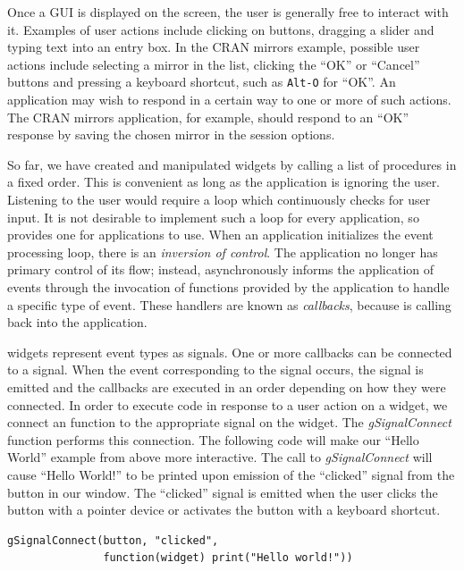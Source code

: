 \documentclass[article]{jss}
\begin{document}
Once a GUI is displayed on the screen, the user is 
generally free to interact with it. Examples of user actions include 
clicking on buttons, dragging a slider and typing text into an entry
box.
In the CRAN mirrors example, possible user actions include
selecting a mirror in the list, clicking the ``OK'' or ``Cancel''
buttons 
and pressing a keyboard shortcut, such as \texttt{Alt-O} for ``OK''. 
An application may wish to respond in a certain way to one or more of
such actions.
The CRAN mirrors application, for example, should respond to an ``OK''
response
by saving the chosen mirror in the session options.

So far, we have created and manipulated widgets by calling a list
of procedures in a fixed order. This is convenient as long as the
application
is ignoring the user. Listening to the user would
require a loop which continuously checks for user input.
It is not desirable to implement such a loop for every application, so
 provides one for applications to use. When an application
initializes the  event processing loop, there is an 
\emph{inversion of control}. The application no longer has primary
control
of its flow; instead,  asynchronously informs the
application of 
events through the invocation of functions provided by the application
to 
handle a specific type of event. These handlers are known as 
\emph{callbacks}, because  is calling back into the
application. 

 widgets represent event types as signals. One or more
callbacks can be connected to a signal. When the event corresponding
to the
signal occurs, the signal is emitted and the callbacks are executed in
an order
depending on how they were connected. In order to execute 
code in 
response to a user action on a widget, we connect an 
function to the 
appropriate signal on the widget.  The \emph{gSignalConnect} function 
performs this connection. The following code will make our ``Hello
World'' 
example from above more interactive.
The call to \emph{gSignalConnect} will cause ``Hello World!'' to be
printed 
upon emission of the ``clicked'' signal from the button in our window.
The 
``clicked'' signal is emitted when the user clicks the button with a
pointer
device or activates the button with a keyboard shortcut.
\begin{verbatim}
gSignalConnect(button, "clicked", 
               function(widget) print("Hello world!"))
\end{verbatim}
\end{document}
